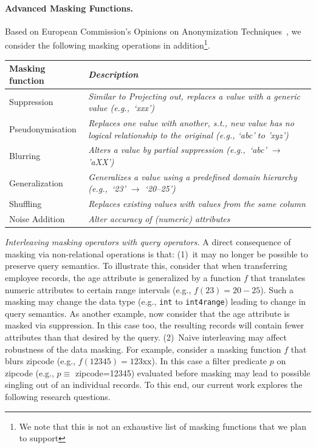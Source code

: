 \documentclass[11pt]{article}
\begin{document}
\paragraph{Advanced Masking Functions.} Based on European
Commission's Opinions on Anonymization
Techniques~\cite{eu-dpw}, we consider the following masking
operations in addition\footnote{We note that this is not an
exhaustive list of masking functions that we plan to
support}.
\begin{center}
\begin{tabular}{l>{\em}p{140mm}}
\toprule
Masking function & Description \\
\midrule
Suppression      & Similar to Projecting out, replaces a value with a generic value (e.g.,~`xxx') \\
Pseudonymisation & Replaces one value with another, s.t., new value has no logical relationship to the original (e.g., `abc' $to$ 'xyz')  \\
Blurring         & Alters a value by partial suppression (e.g.,~`abc' $\to$ 'aXX') \\
Generalization   & Generalizes a value using a predefined domain hierarchy (e.g.,~`23' $\to$ `20--25') \\
Shuffling        & Replaces existing values with values from the same column\\
Noise Addition   & Alter accuracy of (numeric) attributes\\
\bottomrule  
\end{tabular}
\end{center}


\emph{Interleaving masking operators with query operators.}
A direct consequence of masking via non-relational
operations is that: (1)~it may no longer be possible to
preserve query semantics. To illustrate this, consider that
when transferring employee records, the age attribute is
generalized by a function $f$ that translates numeric
attributes to certain range intervals (e.g., $f(23)=20-25$).
Such a masking may change the data type (e.g., \texttt{int}
to \texttt{int4range}) leading to change in query semantics.
As another example, now consider that the age attribute is
masked via suppression. In this case too, the resulting
records will contain fewer attributes than that desired by
the query. (2)~Naive interleaving may affect robustness of
the data masking. For example, consider a masking function
$f$ that blurs zipcode (e.g., $f(12345)=123\text{xx}$). In
this case a filter predicate $p$ on zipcode (e.g., $p\equiv$
zipcode=12345) evaluated before masking may lead to possible
singling out of an individual records. To this end, our
current work explores the following research questions.
\end{document}
